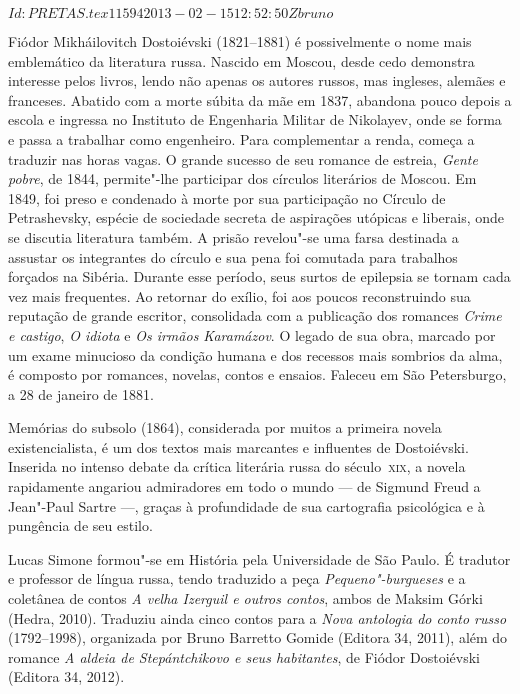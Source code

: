 \SVN $Id: PRETAS.tex 11594 2013-02-15 12:52:50Z bruno $
\begin{resumopage}
	
\item[Fiódor Mikháilovitch Dostoiévski] (1821--1881) é possivelmente o nome mais emblemático
da literatura russa. Nascido em Moscou, desde cedo demonstra interesse pelos livros, lendo não apenas os autores russos,
mas ingleses, alemães e franceses. Abatido com a morte súbita da mãe em 1837, abandona pouco depois a escola e ingressa 
no Instituto de Engenharia Militar de Nikolayev, onde se forma e passa a trabalhar como engenheiro. 
Para complementar a renda, começa a traduzir nas horas vagas. O grande sucesso de seu romance de estreia, \textit{Gente pobre}, 
de 1844, permite"-lhe participar dos círculos literários de Moscou. Em 1849, foi
preso e condenado à morte por sua participação no Círculo de Petrashevsky, 
espécie de sociedade secreta de aspirações utópicas e liberais, onde se discutia literatura também. 
A prisão revelou"-se uma farsa destinada a assustar os integrantes do círculo e sua pena foi comutada para 
trabalhos forçados na Sibéria. Durante esse período, seus surtos de epilepsia se tornam cada vez mais
frequentes. Ao retornar do exílio, foi aos poucos reconstruindo sua reputação de grande escritor, consolidada com a
publicação dos romances \textit{Crime e castigo}, \textit{O idiota} e \textit{Os irmãos Karamázov}. 
O legado de sua obra, marcado por um exame minucioso da condição humana e dos recessos mais sombrios da alma,
é composto por romances, novelas, contos e ensaios. Faleceu em São Petersburgo, a 28 de janeiro de 1881.

\item[Memórias do subsolo] (1864), considerada por muitos a primeira
novela existencialista, é um dos textos mais marcantes e influentes de Dostoiévski. 
Inserida no intenso debate da crítica literária russa do século~\textsc{xix}, a novela 
rapidamente angariou admiradores em todo o mundo --- de Sigmund Freud a Jean"-Paul Sartre ---,
graças à profundidade de sua cartografia psicológica e à pungência de seu estilo.
        
\item[Lucas Simone] formou"-se em História pela
Universidade de São Paulo. É tradutor e professor de língua russa,
tendo traduzido a peça \textit{Pequeno"-burgueses} e a coletânea de contos \textit{A velha
Izerguil e outros contos}, ambos de Maksim Górki (Hedra, 2010).
Traduziu ainda cinco contos para a \textit{Nova antologia do conto
russo} (1792--1998), organizada por Bruno Barretto Gomide (Editora 34,
2011), além do romance \textit{A aldeia de Stepántchikovo e seus
habitantes}, de Fiódor Dostoiévski (Editora 34, 2012).

\end{resumopage}

